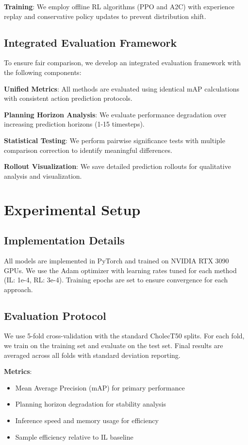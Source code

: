 \documentclass[conference]{IEEEtran}
\begin{document}
\textbf{Training}: We employ offline RL algorithms (PPO and A2C) with experience replay and conservative policy updates to prevent distribution shift.

\subsection{Integrated Evaluation Framework}

To ensure fair comparison, we develop an integrated evaluation framework with the following components:

\textbf{Unified Metrics}: All methods are evaluated using identical mAP calculations with consistent action prediction protocols.

\textbf{Planning Horizon Analysis}: We evaluate performance degradation over increasing prediction horizons (1-15 timesteps).

\textbf{Statistical Testing}: We perform pairwise significance tests with multiple comparison correction to identify meaningful differences.

\textbf{Rollout Visualization}: We save detailed prediction rollouts for qualitative analysis and visualization.

\section{Experimental Setup}

\subsection{Implementation Details}

All models are implemented in PyTorch and trained on NVIDIA RTX 3090 GPUs. We use the Adam optimizer with learning rates tuned for each method (IL: 1e-4, RL: 3e-4). Training epochs are set to ensure convergence for each approach.

\subsection{Evaluation Protocol}

We use 5-fold cross-validation with the standard CholecT50 splits. For each fold, we train on the training set and evaluate on the test set. Final results are averaged across all folds with standard deviation reporting.

\textbf{Metrics}:
\begin{itemize}
\item Mean Average Precision (mAP) for primary performance
\item Planning horizon degradation for stability analysis
\item Inference speed and memory usage for efficiency
\item Sample efficiency relative to IL baseline
\end{itemize}
\end{document}
